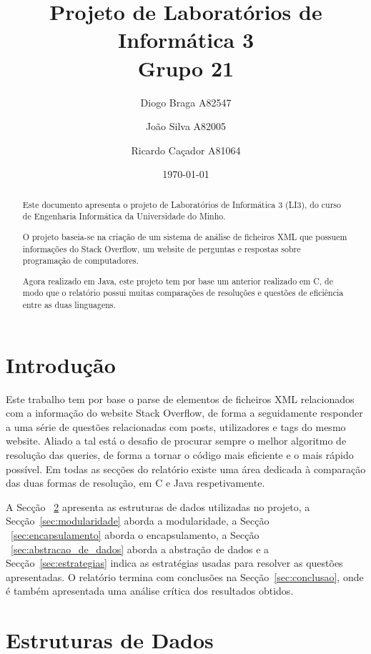 \documentclass[a4paper]{article}
\title{Projeto de Laboratórios de Informática 3\\Grupo 21}
\author{Diogo Braga A82547 \and João Silva A82005 \and Ricardo Caçador A81064}
\date{\today}
\begin{document}
\maketitle

\begin{abstract}
Este documento apresenta o projeto de Laboratórios de Informática
3 (LI3), do curso de Engenharia Informática da Universidade
do Minho.

O projeto baseia-se na criação de um sistema de análise de ficheiros 
XML que possuem informações do Stack Overflow, um website de perguntas
e respostas sobre programação de computadores.

Agora realizado em Java, este projeto tem por base um anterior realizado em
C, de modo que o relatório possui muitas comparações de resoluções e
questões de eficiência entre as duas linguagens.

\end{abstract}

\tableofcontents
\listoffigures

\section{Introdução}
\label{sec:intro}

Este trabalho tem por base o parse de elementos de ficheiros XML
relacionados com a informação do website Stack Overflow, de forma
a seguidamente responder a uma série de questões relacionadas com
posts, utilizadores e tags do mesmo website. Aliado a tal está o desafio
de procurar sempre o melhor algoritmo de resolução das queries, de 
forma a tornar o código mais eficiente e o mais rápido possível.
Em todas as secções do relatório existe uma área dedicada à comparação
das duas formas de resolução, em C e Java respetivamente.

A Secção ~\ref{sec:estruturas} apresenta as estruturas de dados utilizadas 
no projeto, a Secção~\ref{sec:modularidade} aborda a modularidade, 
a Secção ~\ref{sec:encapsulamento} aborda o encapsulamento, a 
Secção ~\ref{sec:abstracao_de_dados} aborda a abstração de dados e a 
Secção~\ref{sec:estrategias} indica as estratégias usadas para resolver 
as questões apresentadas. O relatório termina com conclusões na
Secção~\ref{sec:conclusao}, onde é também apresentada uma análise
crítica dos resultados obtidos.

\section{Estruturas de Dados}
\label{sec:estruturas}
\end{document}
